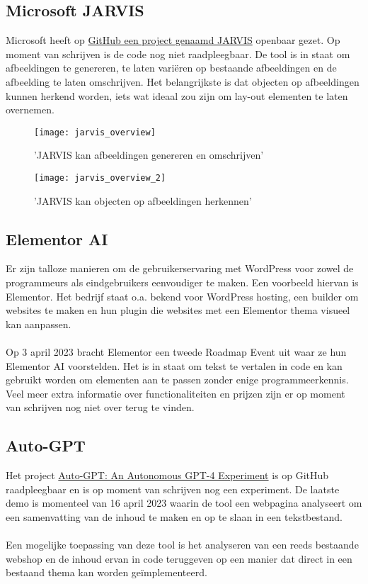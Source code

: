 \subsection{Microsoft JARVIS}
Microsoft heeft op \href{https://github.com/microsoft/JARVIS}{GitHub een project genaamd JARVIS} openbaar gezet. Op moment van schrijven is de code nog niet raadpleegbaar. De tool is in staat om afbeeldingen te genereren, te laten variëren op bestaande afbeeldingen en de afbeelding te laten omschrijven. Het belangrijkste is dat objecten op afbeeldingen kunnen herkend worden, iets wat ideaal zou zijn om lay-out elementen te laten overnemen.
\begin{figure}
    \caption{'JARVIS kan afbeeldingen genereren en omschrijven'}
    \begin{center}
        \texttt{[image: jarvis\_overview]}
    \end{center}
\end{figure}
\begin{figure}
    \caption{'JARVIS kan objecten op afbeeldingen herkennen'}
    \begin{center}
        \texttt{[image: jarvis\_overview\_2]}
    \end{center}
\end{figure}
\subsection{Elementor AI}
Er zijn talloze manieren om de gebruikerservaring met WordPress voor zowel de programmeurs als eindgebruikers eenvoudiger te maken. Een voorbeeld hiervan is Elementor. Het bedrijf staat o.a. bekend voor WordPress hosting, een builder om websites te maken en hun plugin die websites met een Elementor thema visueel kan aanpassen.
\\\\
Op 3 april 2023 bracht Elementor een tweede Roadmap Event \autocite{Laster2023} uit waar ze hun Elementor AI voorstelden. Het is in staat om tekst te vertalen in code en kan gebruikt worden om elementen aan te passen zonder enige programmeerkennis. Veel meer extra informatie over functionaliteiten en prijzen zijn er op moment van schrijven nog niet over terug te vinden.
\subsection{Auto-GPT}
Het project \href{https://github.com/Significant-Gravitas/Auto-GPT}{Auto-GPT: An Autonomous GPT-4 Experiment} is op GitHub raadpleegbaar en is op moment van schrijven nog een experiment. De laatste demo is momenteel van 16 april 2023 waarin de tool een webpagina analyseert om een samenvatting van de inhoud te maken en op te slaan in een tekstbestand.
\\\\
Een mogelijke toepassing van deze tool is het analyseren van een reeds bestaande webshop en de inhoud ervan in code teruggeven op een manier dat direct in een bestaand thema kan worden geïmplementeerd.
